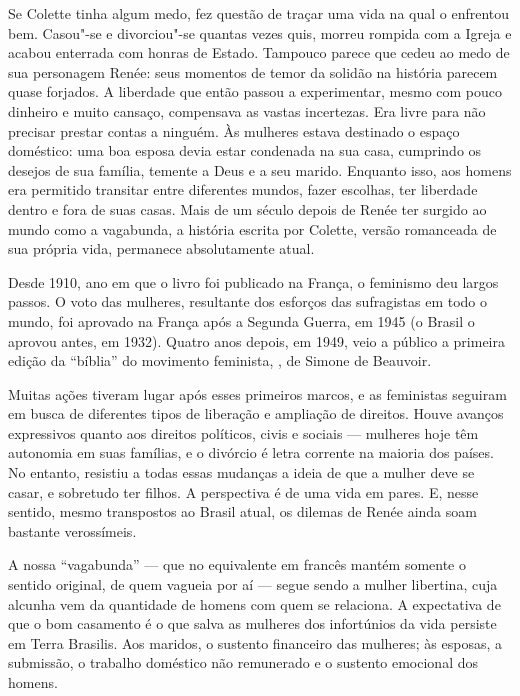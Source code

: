 Se Colette tinha algum medo, fez questão de traçar uma vida na qual o enfrentou bem. Casou"-se e divorciou"-se quantas vezes quis, morreu rompida com a Igreja e acabou enterrada com honras de Estado. Tampouco parece que cedeu ao medo de sua personagem Renée: seus momentos de temor da solidão na história parecem quase forjados. A liberdade que então passou a experimentar, mesmo com pouco dinheiro e muito cansaço, compensava as vastas incertezas. Era livre para não precisar prestar contas a ninguém. Às mulheres estava destinado o espaço doméstico: uma boa esposa devia estar condenada na sua casa, cumprindo os desejos de sua família, temente a Deus e a seu marido. Enquanto isso, aos homens era permitido transitar entre diferentes mundos, fazer escolhas, ter liberdade dentro e fora de suas casas. Mais de um século depois de Renée ter surgido ao mundo como a vagabunda, a história escrita por Colette, versão romanceada de sua própria vida, permanece absolutamente atual.

Desde 1910, ano em que o livro foi publicado na França, o feminismo deu largos passos. O voto das mulheres, resultante dos esforços das sufragistas em todo o mundo, foi aprovado na França após a Segunda Guerra, em 1945 (o Brasil o aprovou antes, em 1932). Quatro anos depois, em 1949, veio a público a primeira edição da “bíblia” do movimento feminista, {}, de Simone de Beauvoir.

Muitas ações tiveram lugar após esses primeiros marcos, e as feministas seguiram em busca de diferentes tipos de liberação e ampliação de direitos. Houve avanços expressivos quanto aos direitos políticos, civis e sociais --- mulheres hoje têm autonomia em suas famílias, e o divórcio é letra corrente na maioria dos países. No entanto, resistiu a todas essas mudanças a ideia de que a mulher deve se casar, e sobretudo ter filhos. A perspectiva é de uma vida em pares. E, nesse sentido, mesmo transpostos ao Brasil atual, os dilemas de Renée ainda soam bastante verossímeis. 

A nossa “vagabunda” --- que no equivalente em francês {} mantém somente o sentido original, de quem vagueia por aí --- segue sendo a mulher libertina, cuja alcunha vem da quantidade de homens com quem se relaciona. A expectativa de que o bom casamento é o que salva as mulheres dos infortúnios da vida persiste em Terra Brasilis. Aos maridos, o sustento financeiro das mulheres; às esposas, a submissão, o trabalho doméstico não remunerado e o sustento emocional dos homens.

